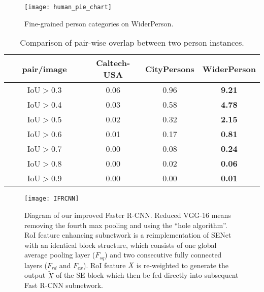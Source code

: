 \documentclass[journal]{IEEEtran}
\begin{document}
\begin{figure}
\begin{centering}
\texttt{[image: human\_pie\_chart]}
\par\end{centering}
\caption{Fine-grained person categories on WiderPerson.}
\label{fig:human-categories}
\end{figure}

\begin{table}[t]
\caption{Comparison of pair-wise overlap between two person instances.} \label{tab:PairOverlap}
\begin{center}
\begin{tabular}{c|ccc}
\toprule[2pt]
{\ \ \ pair/image\ \ \ } & {Caltech-USA} & {CityPersons} & {WiderPerson} \\
\midrule
{IoU$>$0.3} & {0.06} & {0.96} & \bf{9.21} \\
{IoU$>$0.4} & {0.03} & {0.58} & \bf{4.78} \\
{IoU$>$0.5} & {0.02} & {0.32} & \bf{2.15} \\
{IoU$>$0.6} & {0.01} & {0.17} & \bf{0.81} \\
{IoU$>$0.7} & {0.00} & {0.08} & \bf{0.24} \\
{IoU$>$0.8} & {0.00} & {0.02} & \bf{0.06} \\
{IoU$>$0.9} & {0.00} & {0.00} & \bf{0.01} \\
\bottomrule[2pt]
\end{tabular}
\end{center}
\end{table}

\begin{figure*}
\begin{centering}
\texttt{[image: IFRCNN]}
\par\end{centering}
\caption{Diagram of our improved Faster R-CNN. Reduced VGG-16 means removing the fourth max pooling and using the ``hole algorithm''. RoI feature enhancing subnetwork is a reimplementation of SENet with an identical block structure, which consists of one global average pooling layer ($F_{sq}$) and two consecutive fully connected layers ($F_{rd}$ and $F_{ex}$). RoI feature {$\emph{X}$} is re-weighted to generate the output \emph{$\widetilde{X}$} of the SE block which then be fed directly into subsequent Fast R-CNN subnetwork.}
\label{fig:ifrcnn}
\end{figure*}
\end{document}
